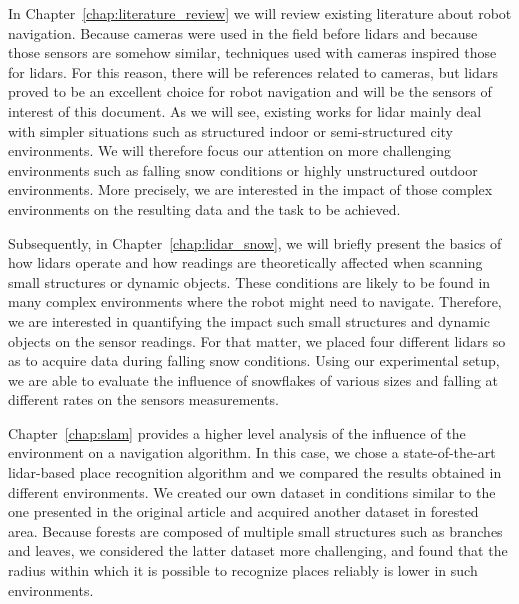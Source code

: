 In Chapter~\ref{chap:literature_review} we will review existing literature about robot navigation. Because cameras were used in the field before \gls*{lidar}s and because those sensors are somehow similar, techniques used with cameras inspired those for \gls*{lidar}s. For this reason, there will be references related to cameras, but \gls*{lidar}s proved to be an excellent choice for robot navigation and will be the sensors of interest of this document. As we will see, existing works for \gls*{lidar} mainly deal with simpler situations such as structured indoor or semi-structured city environments. We will therefore focus our attention on more challenging environments such as falling snow conditions or highly unstructured outdoor environments. More precisely, we are interested in the impact of those complex environments on the resulting data and the task to be achieved.

Subsequently, in Chapter~\ref{chap:lidar_snow}, we will briefly present the basics of how \gls*{lidar}s operate and how readings are theoretically affected when scanning small structures or dynamic objects. These conditions are likely to be found in many complex environments where the robot might need to navigate. Therefore, we are interested in quantifying the impact such small structures and dynamic objects on the sensor readings. For that matter, we placed four different \gls*{lidar}s so as to acquire data during falling snow conditions. Using our experimental setup, we are able to evaluate the influence of snowflakes of various sizes and falling at different rates on the sensors measurements. 

Chapter~\ref{chap:slam} provides a higher level analysis of the influence of the environment on a navigation algorithm. In this case, we chose a state-of-the-art \gls*{lidar}-based place recognition algorithm and we compared the results obtained in different environments. We created our own dataset in conditions similar to the one presented in the original article and acquired another dataset in forested area. Because forests are composed of multiple small structures such as branches and leaves, we considered the latter dataset more challenging, and found that the radius within which it is possible to recognize places reliably is lower in such environments.

